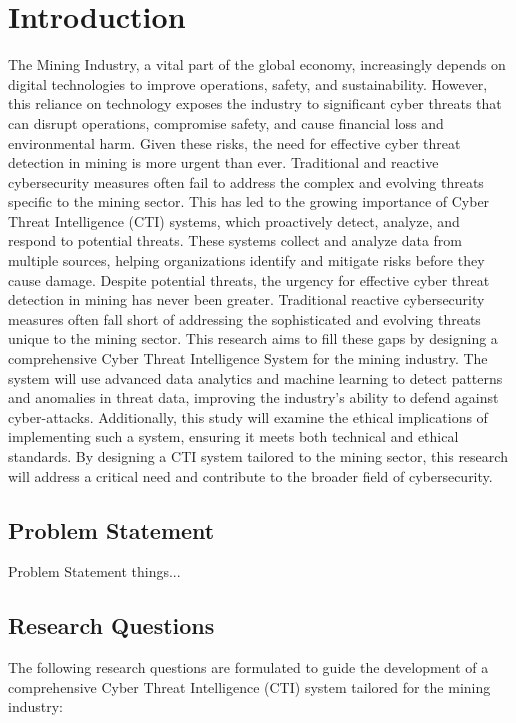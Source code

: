 \documentclass[a4paper,twoside,12pt]{report}
\begin{document}
\chapter{Introduction}
The Mining Industry, a vital part of the global economy, increasingly depends on digital technologies to improve operations, safety, and sustainability. However, this reliance on technology exposes the industry to significant cyber threats that can disrupt operations, compromise safety, and cause financial loss and environmental harm. Given these risks, the need for effective cyber threat detection in mining is more urgent than ever. Traditional and reactive cybersecurity measures often fail to address the complex and evolving threats specific to the mining sector. This has led to the growing importance of Cyber Threat Intelligence (CTI) systems, which proactively detect, analyze, and respond to potential threats. These systems collect and analyze data from multiple sources, helping organizations identify and mitigate risks before they cause damage. Despite potential threats, the urgency for effective cyber threat detection in mining has never been greater. Traditional reactive cybersecurity measures often fall short of addressing the sophisticated and evolving threats unique to the mining sector. This research aims to fill these gaps by designing a comprehensive Cyber Threat Intelligence System for the mining industry. The system will use advanced data analytics and machine learning to detect patterns and anomalies in threat data, improving the industry’s ability to defend against cyber-attacks. Additionally, this study will examine the ethical implications of implementing such a system, ensuring it meets both technical and ethical standards. By designing a CTI system tailored to the mining sector, this research will address a critical need and contribute to the broader field of cybersecurity.
\section{Problem Statement}
Problem Statement things...\\
\section{Research Questions}

The following research questions are formulated to guide the development of a comprehensive Cyber Threat Intelligence (CTI) system tailored for the mining industry:
\end{document}
